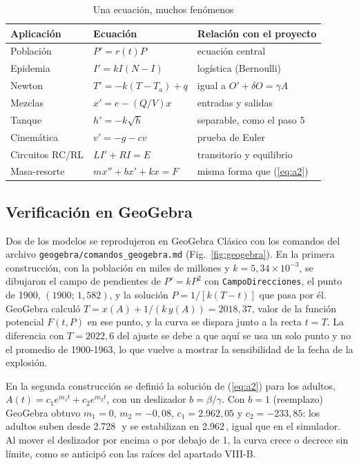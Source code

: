 \documentclass[10pt,twocolumn,letterpaper]{article}
\newcommand{\M}{\,\text{M}}
\begin{document}
\begin{table}[h]
\centering\footnotesize
\caption{Una ecuación, muchos fenómenos}
\label{tab:apl}
\setlength{\tabcolsep}{3pt}
\begin{tabular}{lll}
\toprule
Aplicación & Ecuación & Relación con el proyecto\\
\midrule
Población & $P'=r(t)P$ & ecuación central\\
Epidemia & $I'=kI(N-I)$ & logística (Bernoulli)\\
Newton & $T'=-k(T-T_a)+q$ & igual a $O'+\delta O=\gamma A$\\
Mezclas & $x'=e-(Q/V)x$ & entradas y salidas\\
Tanque & $h'=-k\sqrt h$ & separable, como el paso 5\\
Cinemática & $v'=-g-cv$ & prueba de Euler\\
Circuitos RC/RL & $LI'+RI=E$ & transitorio y equilibrio\\
Masa-resorte & $mx''+bx'+kx=F$ & misma forma que (\ref{eq:a2})\\
\bottomrule
\end{tabular}
\end{table}


\subsection{Verificación en GeoGebra}
Dos de los modelos se reprodujeron en GeoGebra Clásico con los comandos del archivo \texttt{geogebra/comandos\_geogebra.md} (Fig.~\ref{fig:geogebra}). En la primera construcción, con la población en miles de millones y $k=5{,}34\times10^{-3}$, se dibujaron el campo de pendientes de $P'=kP^2$ con \texttt{CampoDirecciones}, el punto de 1900, $(1900;\,1{,}582)$, y la solución $P=1/[k(T-t)]$ que pasa por él. GeoGebra calculó $T=x(A)+1/(k\,y(A))=2018{,}37$, valor de la función potencial $F(t,P)$ en ese punto, y la curva se dispara junto a la recta $t=T$. La diferencia con $T=2022{,}6$ del ajuste se debe a que aquí se usa un solo punto y no el promedio de 1900-1963, lo que vuelve a mostrar la sensibilidad de la fecha de la explosión.

En la segunda construcción se definió la solución de (\ref{eq:a2}) para los adultos, $A(t)=c_1e^{m_1t}+c_2e^{m_2t}$, con un deslizador $b=\beta/\gamma$. Con $b=1$ (reemplazo) GeoGebra obtuvo $m_1=0$, $m_2=-0{,}08$, $c_1=2.962{,}05$ y $c_2=-233{,}85$: los adultos suben desde 2.728\M\ y se estabilizan en 2.962\M, igual que en el simulador. Al mover el deslizador por encima o por debajo de 1, la curva crece o decrece sin límite, como se anticipó con las raíces del apartado VIII-B.
\end{document}

